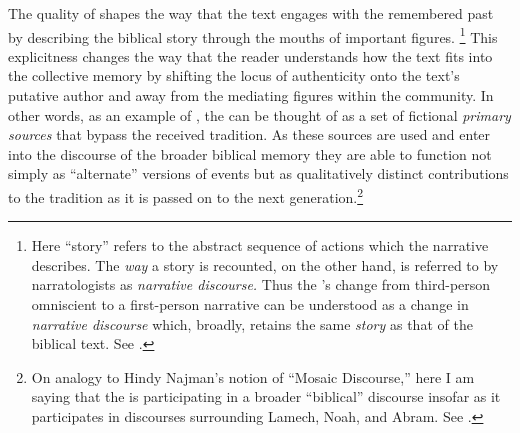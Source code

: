 The \psgraphic quality of \ga shapes the way that the text engages with the remembered past by describing the biblical story through the mouths of important figures.%
%
\footnote{Here ``story'' refers to the abstract sequence of actions which the narrative describes. The \emph{way} a story is recounted, on the other hand, is referred to by narratologists as \emph{narrative discourse.} Thus the \ga's change from third-person omniscient to a \psgraphical first-person narrative can be understood as a change in \emph{narrative discourse} which, broadly, retains the same \emph{story} as that of the biblical text. See \cite[13--27, esp. 18--19]{abbott2008}.}
%
This explicitness changes the way that the reader understands how the text fits into the collective memory by shifting the locus of authenticity onto the text's putative author and away from the mediating figures within the community. In other words, as an example of \psy, the \ga can be thought of as a set of fictional \emph{primary sources} that bypass the received tradition. As these sources are used and enter into the discourse of the broader biblical memory they are able to function not simply as ``alternate'' versions of events but as qualitatively distinct contributions to the tradition as it is passed on to the next generation.\footnote{On analogy to Hindy Najman's notion of ``Mosaic Discourse,'' here I am saying that the \ga is participating in a broader ``biblical'' discourse insofar as it participates in discourses surrounding Lamech, Noah, and Abram. See \cite[GET PAGE]{najman2003}.}

